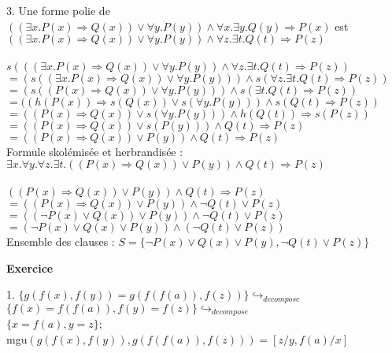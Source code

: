 \documentclass[11pt,letterpaper]{article}
\newcommand{\exo}[1]{\Large \textbf{Exercice \numprint{#1}} \vspace{10px} \normalsize}
\newcommand\tab[1][12pt]{\hspace*{#1}}
\begin{document}
\vspace{6px}

3.  Une forme polie de $((\exists x.P(x) \Rightarrow Q(x)) \lor \forall y.P(y)) \land \forall x.\exists y.Q(y) \Rightarrow P(x)$ est\\\tab
$((\exists x.P(x) \Rightarrow Q(x)) \lor \forall y.P(y)) \land \forall z.\exists t.Q(t) \Rightarrow P(z)$\\\tab
\\\tab
$s(((\exists x.P(x) \Rightarrow Q(x)) \lor \forall y.P(y)) \land \forall z.\exists t.Q(t) \Rightarrow P(z))$\\\tab
$= (s((\exists x.P(x) \Rightarrow Q(x)) \lor \forall y.P(y))) \land s(\forall z.\exists t.Q(t) \Rightarrow P(z))$\\\tab
$= (s((P(x) \Rightarrow Q(x)) \lor \forall y.P(y))) \land s(\exists t.Q(t) \Rightarrow P(z))$\\\tab
$= ((h(P(x)) \Rightarrow s(Q(x)) \lor s(\forall y.P(y))) \land s(Q(t) \Rightarrow P(z))$\\\tab
$= ((P(x) \Rightarrow Q(x)) \lor s(\forall y.P(y))) \land h(Q(t)) \Rightarrow s(P(z))$\\\tab
$= ((P(x) \Rightarrow Q(x)) \lor s(P(y))) \land Q(t) \Rightarrow P(z)$\\\tab
$= ((P(x) \Rightarrow Q(x)) \lor P(y)) \land Q(t) \Rightarrow P(z)$\\\tab
Formule skolémisée et herbrandisée : $\exists x.\forall y.\forall z.\exists t.((P(x) \Rightarrow Q(x)) \lor P(y)) \land Q(t) \Rightarrow P(z)$\\\tab
\\\tab
$((P(x) \Rightarrow Q(x)) \lor P(y)) \land Q(t) \Rightarrow P(z)$\\\tab
$= ((P(x) \Rightarrow Q(x)) \lor P(y)) \land \neg Q(t) \lor P(z)$\\\tab
$= ((\neg P(x) \lor Q(x)) \lor P(y)) \land \neg Q(t) \lor P(z)$\\\tab
$= (\neg P(x) \lor Q(x) \lor P(y)) \land (\neg Q(t) \lor P(z))$\\\tab
Ensemble des clauses : $S = \{\neg P(x) \lor Q(x) \lor P(y), \neg Q(t) \lor P(z)\}$\\

\vspace{12px}

\exo{6}


1. $\{g(f(x),f(y)) = g(f(f(a)),f(z))\} \hookrightarrow_{decompose}$\\\tab
$\{f(x)=f(f(a)), f(y)=f(z)\} \hookrightarrow_{decompose}$\\\tab
$\{x=f(a), y=z\}$;\\\tab
mgu$(g(f(x),f(y)),g(f(f(a)),f(z))) = [z/y,f(a)/x]$\\
\end{document}
